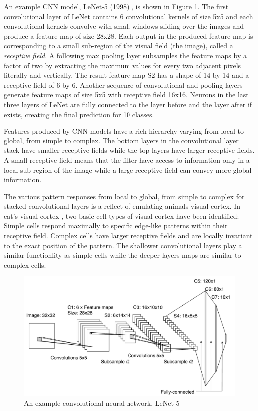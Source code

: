 
An example CNN model, LeNet-5 (1998) \cite{lecun1998gradient}, is shown in Figure \ref{fig:lenet}.
The first convolutional layer of LeNet contains 6 convolutional kernels of size 5x5 and each convolutional kernels convolve with small windows sliding over the images and produce a feature map of size 28x28.
Each output in the produced feature map is corresponding to a small sub-region of the visual field (the image), called a \textit{receptive field}.
A following max pooling layer subsamples the feature maps by a factor of two by extracting the maximum values for every two adjacent pixels literally and vertically.
The result feature map S2 has a shape of 14 by 14 and a receptive field of 6 by 6.
Another sequence of convolutional and pooling layers generate feature maps of size 5x5 with receptive field 16x16.
Neurons in the last three layers of LeNet are fully connected to the layer before and the layer after if exists, creating the final prediction for 10 classes.

Features produced by CNN models have a rich hierarchy varying from local to global, from simple to complex.
The bottom layers in the convolutional layer stack have smaller receptive fields while the top layers have larger receptive fields.
A small receptive field means that the filter have access to information only in a local sub-region of the image while a large receptive field can convey more global information.

The various pattern responses from local to global, from simple to complex for stacked convolutional layers is a reflect of emulating animals visual cortex.
In cat's visual cortex \cite{hubel1962receptive}, two basic cell types of visual cortex have been identified:
Simple cells respond maximally to specific edge-like patterns within their receptive field.
Complex cells have larger receptive fields and are locally invariant to the exact position of the pattern.
The shallower convolutional layers play a similar functionlity as simple cells while the deeper layers maps are similar to complex cells.

\begin{figure}[t]
\centering
   \includegraphics[width=\linewidth]{img/lenet}
\caption{An example convolutional neural network, LeNet-5 \cite{lecun1998gradient}}
\label{fig:lenet}
\end{figure}

